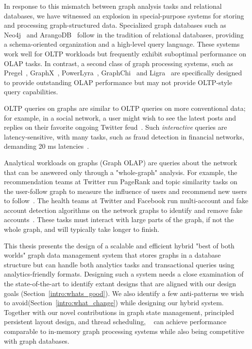 In response to this mismatch between graph analysis tasks and relational databases, we have witnessed an explosion in special-purpose systems for storing and processing graph-structured data.
Specialized graph databases such as Neo4j~\cite{neo4j} and ArangoDB~\cite{arangodb} follow in the tradition of relational databases, providing a schema-oriented organization and a high-level query language. These systems work well for OLTP workloads but frequently exhibit suboptimal performance on OLAP tasks.
In contrast, a second class of graph processing systems, such as  Pregel~\cite{malewicz2010pregel}, GraphX~\cite{gonzalez2014graphx}, PowerLyra~\cite{powerlyra2019}, GraphChi~\cite{kyrola2012graphchi} and Ligra~\cite{shun2013ligra} are specifically designed to provide outstanding OLAP performance but may not provide OLTP-style query capabilities.

OLTP queries on graphs are similar to OLTP queries on more conventional data; for example, in a social network, a user might wish to see the latest posts and replies on their favorite ongoing Twitter feud~\cite{AholeMusk:online}.
Such \emph{interactive} queries are latency-sensitive, with many tasks, such as fraud detection in financial networks, demanding 20 ms latencies~\cite{qiu2018real}.


Analytical workloads on graphs (Graph OLAP) are queries about the network that can be answered only through a "whole-graph" analysis.
For example, the recommendation teams at Twitter run PageRank and topic similarity tasks on the user-follow graph to measure the influence of users and recommend new users to follow~\cite{tang2022taming}.
The health teams at Twitter and Facebook run multi-account and fake account detection algorithms on the network graphs to identify and remove fake accounts~\cite{breuer2020friend}.
These tasks must interact with large parts of the graph, if not the whole graph, and will typically take longer to finish.

This thesis presents the design of a scalable and efficient hybrid "best of both worlds" graph data management system that stores graphs in a database structure but can handle both analytics tasks and transactional queries using analytics-friendly formats.
Designing such a system needs a close examination of the state-of-the-art to identify extant designs that are aligned with our design goals (Section~\ref{intro:whats_good}). 
We also identify a few anti-patterns we wish to avoid(Section~\ref{intro:what_change}) while designing our hybrid system.
Together with our novel contributions in graph state management, principled persistent layout design, and thread scheduling, ~\project{} can achieve performance comparable to in-memory graph processing systems while also being competitive with graph databases.
